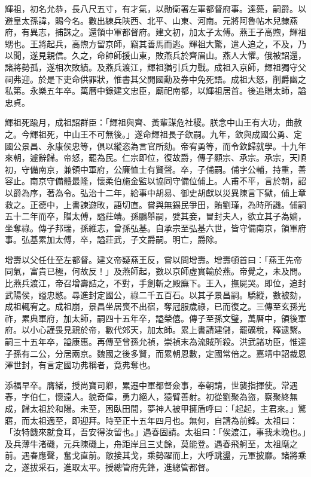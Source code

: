 \begin{pinyinscope}
輝祖，初名允恭，長八尺五寸，有才氣，以勛衛署左軍都督府事。達薨，嗣爵。以避皇太孫諱，賜今名。數出練兵陜西、北平、山東、河南。元將阿魯帖木兒隸燕府，有異志，捕誅之。還領中軍都督府。建文初，加太子太傅。燕王子高煦，輝祖甥也。王將起兵，高煦方留京師，竊其善馬而逃。輝祖大驚，遣人追之，不及，乃以聞，遂見親信。久之，命帥師援山東，敗燕兵於齊眉山。燕人大懼。俄被詔還，諸將勢孤，遂相次敗績。及燕兵渡江，輝祖猶引兵力戰。成祖入京師，輝祖獨守父祠弗迎。於是下吏命供罪狀，惟書其父開國勳及券中免死語。成祖大怒，削爵幽之私第。永樂五年卒。萬曆中錄建文忠臣，廟祀南都，以輝祖居首。後追贈太師，謚忠貞。

輝祖死踰月，成祖詔群臣：「輝祖與齊、黃輩謀危社稷。朕念中山王有大功，曲赦之。今輝祖死，中山王不可無後。」遂命輝祖長子欽嗣。九年，欽與成國公勇、定國公景昌、永康侯忠等，俱以縱恣為言官所劾。帝宥勇等，而令欽歸就學。十九年來朝，遽辭歸。帝怒，罷為民。仁宗即位，復故爵，傳子顯宗、承宗。承宗，天順初，守備南京，兼領中軍府，公廉恤士有賢聲。卒，子俌嗣。俌字公輔，持重，善容止。南京守備體最隆，懷柔伯施金監以協同守備位俌上。人甫不平，言於朝，詔以爵為序，著為令。弘治十二年，給事中胡易、御史胡獻以災異陳言下獄，俌上章救之。正德中，上書諫遊畋，語切直。嘗與無錫民爭田，賄劉瑾，為時所譏。俌嗣五十二年而卒，贈太傅，謚莊靖。孫鵬舉嗣，嬖其妾，冒封夫人，欲立其子為嫡，坐奪祿。傳子邦瑞，孫維志，曾孫弘基。自承宗至弘基六世，皆守備南京，領軍府事。弘基累加太傅，卒，謚莊武，子文爵嗣。明亡，爵除。

增壽以父任仕至左都督。建文帝疑燕王反，嘗以問增壽。增壽頓首曰：「燕王先帝同氣，富貴已極，何故反！」及燕師起，數以京師虛實輸於燕。帝覺之，未及問。比燕兵渡江，帝召增壽詰之，不對，手劍斬之殿廡下。王入，撫屍哭。即位，追封武陽侯，謚忠愍。尋進封定國公，祿二千五百石。以其子景昌嗣。驕縱，數被劾，成祖輒宥之。成祖崩，景昌坐居喪不出宿，奪冠服歲祿，已而復之。三傳至玄孫光祚，累典軍府，加太師，嗣四十五年卒，謚榮僖。傳子至孫文璧，萬曆中，領後軍府。以小心謹畏見親於帝，數代郊天，加太師。累上書請建儲，罷礦稅，釋逮繫。嗣三十五年卒，謚康惠。再傳至曾孫允禎，崇禎末為流賊所殺。洪武諸功臣，惟達子孫有二公，分居兩京。魏國之後多賢，而累朝恩數，定國常倍之。嘉靖中詔裁恩澤世封，有言定國功弗稱者，竟弗奪也。

添福早卒。膺緒，授尚寶司卿，累遷中軍都督僉事，奉朝請，世襲指揮使。常遇春，字伯仁，懷遠人。貌奇偉，勇力絕人，猿臂善射。初從劉聚為盜，察聚終無成，歸太祖於和陽。未至，困臥田間，夢神人被甲擁盾呼曰：「起起，主君來。」驚寤，而太祖適至，即迎拜。時至正十五年四月也。無何，自請為前鋒。太祖曰：「汝特饑來就食耳，吾安得汝留也。」遇春固請。太祖曰：「俟渡江，事我未晚也。」及兵薄牛渚磯，元兵陳磯上，舟距岸且三丈餘，莫能登。遇春飛舸至，太祖麾之前。遇春應聲，奮戈直前。敵接其戈，乘勢躍而上，大呼跳盪，元軍披靡。諸將乘之，遂拔采石，進取太平。授總管府先鋒，進總管都督。


\end{pinyinscope}
